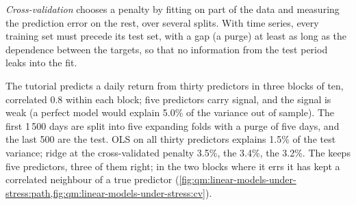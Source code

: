 \begin{definition}\label{def:qm:linear-models-under-stress:cv}
\emph{Cross-validation} chooses a penalty by fitting on part of the data and measuring the prediction error on the rest,
over several splits. With time series, every training set must precede its test set, with a gap (a purge) at least as long as the dependence
between the targets, so that no information from the test period leaks into the fit.
\end{definition}

The tutorial predicts a daily return from thirty predictors in three blocks of ten, correlated 0.8 within each block; five predictors carry
signal, and the signal is weak (a perfect model would explain 5.0\% of the variance out of sample). The first 1\,500 days are split into
five expanding folds with a purge of five days, and the last 500 are the test. OLS on all thirty predictors explains 1.5\% of the test
variance; ridge at the cross-validated penalty 3.5\%, the  3.4\%, the  3.2\%. The  keeps five predictors, three of them
right; in the two blocks where it errs it has kept a correlated neighbour of a true predictor
(\cref{fig:qm:linear-models-under-stress:path,fig:qm:linear-models-under-stress:cv}).

\begin{omfigure}

\label{fig:qm:linear-models-under-stress:path}
\end{omfigure}

